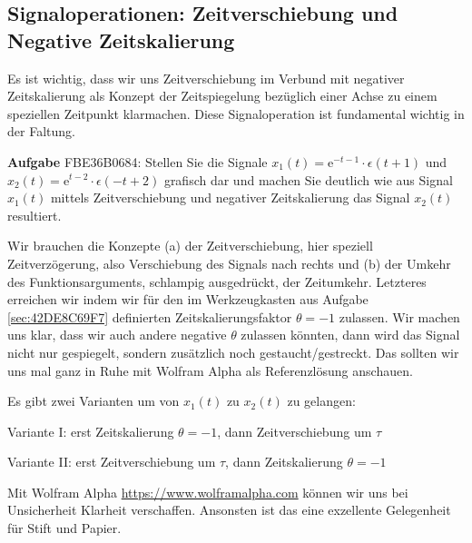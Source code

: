\subsection{Signaloperationen: Zeitverschiebung und Negative Zeitskalierung}
\label{sec:FBE36B0684}
\begin{Ziel}
Es ist wichtig, dass wir uns Zeitverschiebung im Verbund mit negativer Zeitskalierung
als Konzept der Zeitspiegelung bezüglich einer Achse zu einem speziellen Zeitpunkt
klarmachen. Diese Signaloperation ist fundamental wichtig in der Faltung.
\end{Ziel}
\textbf{Aufgabe} {\tiny FBE36B0684}: Stellen Sie die Signale
$x_1(t) = \mathrm{e}^{-t-1} \cdot \epsilon(t+1)$ und
$x_2(t) = \mathrm{e}^{t-2} \cdot \epsilon(-t+2)$
grafisch dar und machen Sie deutlich wie aus Signal $x_1(t)$ mittels Zeitverschiebung
und negativer Zeitskalierung das Signal $x_2(t)$ resultiert.
\begin{Werkzeug}
Wir brauchen die Konzepte (a) der Zeitverschiebung, hier speziell Zeitverzögerung,
also Verschiebung des Signals nach rechts und (b) der Umkehr des Funktionsarguments,
schlampig ausgedrückt, der Zeitumkehr. Letzteres erreichen wir indem wir
für den im Werkzeugkasten aus Aufgabe \ref{sec:42DE8C69F7} definierten
Zeitskalierungsfaktor
$\theta=-1$ zulassen. Wir machen uns klar, dass wir auch andere negative
$\theta$ zulassen könnten, dann wird das Signal nicht nur gespiegelt,
sondern zusätzlich noch gestaucht/gestreckt. Das sollten wir uns mal ganz in Ruhe
mit Wolfram Alpha als Referenzlösung anschauen.
\end{Werkzeug}
\begin{Ansatz}
Es gibt zwei Varianten um von $x_1(t)$ zu $x_2(t)$ zu gelangen:

Variante I: erst Zeitskalierung $\theta=-1$, dann Zeitverschiebung um $\tau$

Variante II: erst Zeitverschiebung um $\tau$, dann Zeitskalierung $\theta=-1$

\end{Ansatz}
\begin{ExCalc}
Mit Wolfram Alpha \url{https://www.wolframalpha.com} können wir uns bei
Unsicherheit Klarheit verschaffen.
%
Ansonsten ist das eine exzellente Gelegenheit für Stift und Papier.
\end{ExCalc}
